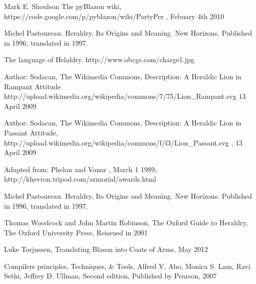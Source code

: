 \begin{thebibliography}{100}

  	Mark E. Shoulson
 	The pyBlazon wiki, 
 	https://code.google.com/p/pyblazon/wiki/PartyPer , 
 	Febuary 4th 2010


	Michel Pastoureau. 
	Heraldry, Its Origins and Meaning.
	New Horizons. 
	Published in 1996, translated in 1997.


	The language of Helaldry.
	http://www.obcgs.com/charge1.jpg

	Author: Sodacan,  
	The Wikimedia Commons,
	Description: A Heraldic Lion in Rampant Attitude
	http://upload.wikimedia.org/wikipedia/commons/7/75/Lion\_Rampant.svg
	13 April 2009

	Author: Sodacan,
	The Wikimedia Commons, 
	Description: A Heraldic Lion in Passant Attitude, 
	http://upload.wikimedia.org/wikipedia/commons/f/f3/Lion\_Passant.svg ,
	13 April 2009
	
	Adapted from: 
	Phelan and Vanor , 
	March 1 1989, 
	http://khevron.tripod.com/armorial/awards.html


	Michel Pastoureau. 
	Heraldry, Its Origins and Meaning.
	New Horizons. 
	Published in 1996, translated in 1997.


	Thomas Woodcock and John Martin Robinson, 
	The Oxford Guide to Heraldry, 
	The Oxford University Press, 
	Reissued in 2001


	Luke Torjussen, 
	Translating Blason into Coats of Arms, 
	May 2012

	Compilers principles, Techniques, \& Tools, 
	Alfred V. Aho, Monica S. Lam, Ravi Sethi, Jeffrey D. Ullman, 
	Second edition,  Published by Pearson, 
	2007 

\end{thebibliography}